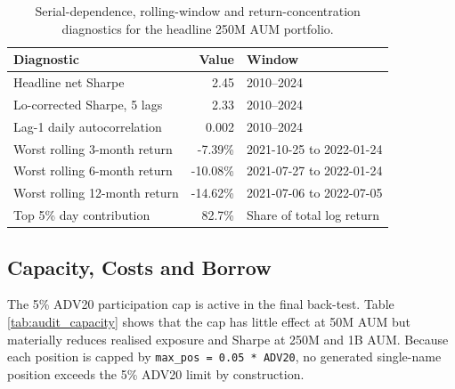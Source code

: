 \documentclass[12pt]{article}
\begin{document}
\begin{table}[!htbp]
\centering
\small
\begin{tabular}{lrl}
\hline
Diagnostic & Value & Window \\
\hline
Headline net Sharpe & 2.45 & 2010--2024 \\
Lo-corrected Sharpe, 5 lags & 2.33 & 2010--2024 \\
Lag-1 daily autocorrelation & 0.002 & 2010--2024 \\
Worst rolling 3-month return & -7.39\% & 2021-10-25 to 2022-01-24 \\
Worst rolling 6-month return & -10.08\% & 2021-07-27 to 2022-01-24 \\
Worst rolling 12-month return & -14.62\% & 2021-07-06 to 2022-07-05 \\
Top 5\% day contribution & 82.7\% & Share of total log return \\
\hline
\end{tabular}
\caption{Serial-dependence, rolling-window and return-concentration diagnostics for the headline 250M AUM portfolio.}
\label{tab:audit_stat_diagnostics}
\end{table}

\FloatBarrier

\subsection{Capacity, Costs and Borrow}

The 5\% ADV20 participation cap is active in the final back-test. Table \ref{tab:audit_capacity} shows that the cap has little effect at 50M AUM but materially reduces realised exposure and Sharpe at 250M and 1B AUM. Because each position is capped by \texttt{max\_pos = 0.05 * ADV20}, no generated single-name position exceeds the 5\% ADV20 limit by construction.

\begin{table}[!htbp]
\centering
\scriptsize
{}
\caption{Capacity diagnostics for the headline 2010--2024 XGBoost portfolio. Positions are capped at 5\% of lagged ADV20.}
\label{tab:audit_capacity}
\end{table}
\end{document}
